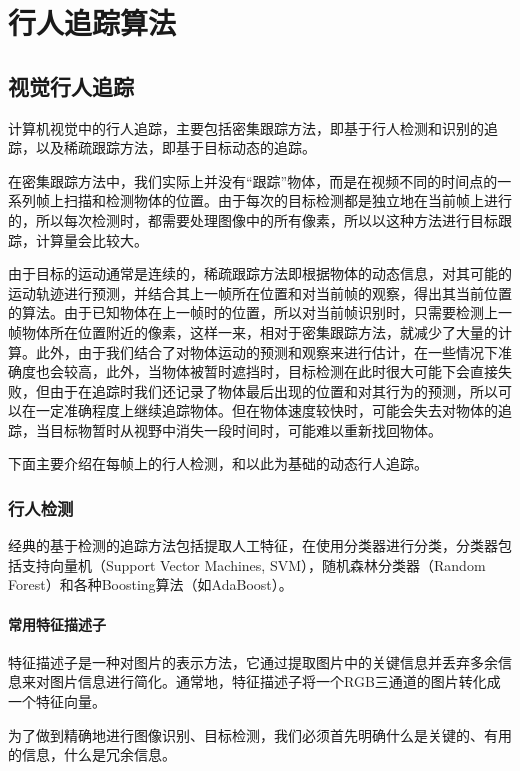 
\chapter{行人追踪算法}
  
\section{视觉行人追踪}
  计算机视觉中的行人追踪，主要包括密集跟踪方法，即基于行人检测和识别的追踪，以及稀疏跟踪方法，即基于目标动态的追踪。

  在密集跟踪方法中，我们实际上并没有“跟踪”物体，而是在视频不同的时间点的一系列帧上扫描和检测物体的位置。由于每次的目标检测都是独立地在当前帧上进行的，所以每次检测时，都需要处理图像中的所有像素，所以以这种方法进行目标跟踪，计算量会比较大。

  由于目标的运动通常是连续的，稀疏跟踪方法即根据物体的动态信息，对其可能的运动轨迹进行预测，并结合其上一帧所在位置和对当前帧的观察，得出其当前位置的算法。由于已知物体在上一帧时的位置，所以对当前帧识别时，只需要检测上一帧物体所在位置附近的像素，这样一来，相对于密集跟踪方法，就减少了大量的计算。此外，由于我们结合了对物体运动的预测和观察来进行估计，在一些情况下准确度也会较高，此外，当物体被暂时遮挡时，目标检测在此时很大可能下会直接失败，但由于在追踪时我们还记录了物体最后出现的位置和对其行为的预测，所以可以在一定准确程度上继续追踪物体。但在物体速度较快时，可能会失去对物体的追踪，当目标物暂时从视野中消失一段时间时，可能难以重新找回物体。

  下面主要介绍在每帧上的行人检测，和以此为基础的动态行人追踪。

\subsection{行人检测}

  经典的基于检测的追踪方法包括提取人工特征，在使用分类器进行分类，分类器包括支持向量机（Support Vector Machines, SVM），随机森林分类器（Random Forest）和各种Boosting算法（如AdaBoost）。

\subsubsection{常用特征描述子}

  特征描述子是一种对图片的表示方法，它通过提取图片中的关键信息并丢弃多余信息来对图片信息进行简化。通常地，特征描述子将一个RGB三通道的图片转化成一个特征向量。
  
  为了做到精确地进行图像识别、目标检测，我们必须首先明确什么是关键的、有用的信息，什么是冗余信息。


